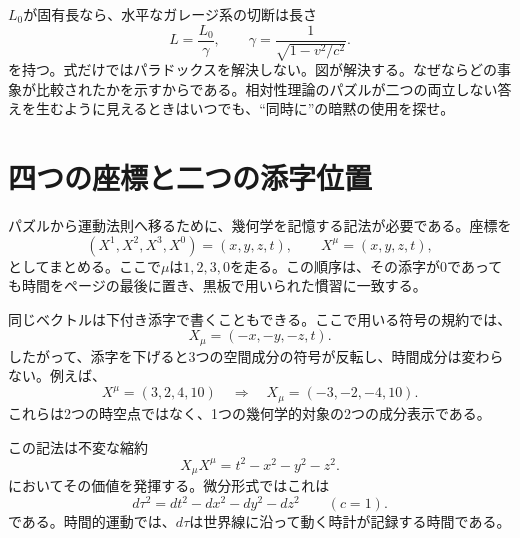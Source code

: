 \(L_0\)が固有長なら、水平なガレージ系の切断は長さ
\begin{equation}
L=\frac{L_0}{\gamma},
\qquad
\gamma=\frac{1}{\sqrt{1-v^2/c^2}}.
\end{equation}
を持つ。式だけではパラドックスを解決しない。図が解決する。なぜならどの事象が比較されたかを示すからである。相対性理論のパズルが二つの両立しない答えを生むように見えるときはいつでも、``同時に''の暗黙の使用を探せ。

\section{四つの座標と二つの添字位置}

パズルから運動法則へ移るために、幾何学を記憶する記法が必要である。座標を
\begin{equation}
(X^1,X^2,X^3,X^0)=(x,y,z,t),
\qquad X^\mu=(x,y,z,t),
\end{equation}
としてまとめる。ここで\(\mu\)は\(1,2,3,0\)を走る。この順序は、その添字が\(0\)であっても時間をページの最後に置き、黒板で用いられた慣習に一致する。

\begin{classroomqa}
\end{classroomqa}

同じベクトルは下付き添字で書くこともできる。ここで用いる符号の規約では、
\begin{equation}
X_\mu=(-x,-y,-z,t).
\end{equation}
したがって、添字を下げると3つの空間成分の符号が反転し、時間成分は変わらない。例えば、
\begin{equation}
X^\mu=(3,2,4,10)
\quad\Longrightarrow\quad
X_\mu=(-3,-2,-4,10).
\end{equation}
これらは2つの時空点ではなく、1つの幾何学的対象の2つの成分表示である。

\begin{classroomqa}
\end{classroomqa}

この記法は不変な縮約
\begin{equation}
X_\mu X^\mu=t^2-x^2-y^2-z^2.
\label{eq:l5-interval}
\end{equation}
においてその価値を発揮する。微分形式ではこれは
\begin{equation}
d\tau^2=dt^2-dx^2-dy^2-dz^2
\qquad (c=1).
\label{eq:l5-proper-time}
\end{equation}
である。時間的運動では、\(d\tau\)は世界線に沿って動く時計が記録する時間である。

